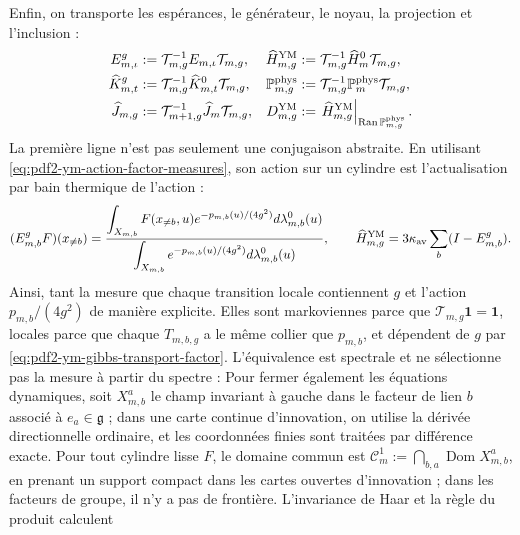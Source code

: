 Enfin, on transporte les espérances, le générateur, le noyau, la projection et l’inclusion :
\begin{equation}\label{eq:pdf2-ym-g-dynamics}
 \begin{aligned}
 E_{m,\iota}^{g}&:=\mathcal T_{m,g}^{-1}E_{m,\iota}\mathcal T_{m,g},&
 \widehat H_{m,g}^{\rm YM}&:=\mathcal T_{m,g}^{-1}\widehat H_m^0\mathcal T_{m,g},\\
 \widehat K_{m,t}^{g}&:=\mathcal T_{m,g}^{-1}\widehat K_{m,t}^{0}\mathcal T_{m,g},&
 \mathbb P_{m,g}^{\rm phys}&:=\mathcal T_{m,g}^{-1}
     \mathbb P_m^{\rm phys}\mathcal T_{m,g},\\
 \widehat J_{m,g}&:=\mathcal T_{m+1,g}^{-1}
     \widehat J_m\mathcal T_{m,g},&
 D_{m,g}^{\rm YM}&:=\left.\widehat H_{m,g}^{\rm YM}
     \right|_{\operatorname{Ran}\mathbb P_{m,g}^{\rm phys}}.
 \end{aligned}
\end{equation}
La première ligne n’est pas seulement une conjugaison abstraite. En utilisant
\eqref{eq:pdf2-ym-action-factor-measures}, son action sur un cylindre est
l’actualisation par bain thermique de l’action :
\begin{equation}\label{eq:pdf2-ym-gibbs-conditional-expectation}
 (E_{m,b}^{g}F)(x_{\ne b})
 =\frac{\displaystyle
   \int_{X_{m,b}}F(x_{\ne b},u)e^{-p_{m,b}(u)/(4g^2)}
       d\lambda_{m,b}^0(u)}{\displaystyle
   \int_{X_{m,b}}e^{-p_{m,b}(u)/(4g^2)}d\lambda_{m,b}^0(u)},
 \qquad
 \widehat H_{m,g}^{\rm YM}
 =3\kappa_{\rm av}\sum_b(I-E_{m,b}^{g}).
\end{equation}
Ainsi, tant la mesure que chaque transition locale contiennent $g$ et l’action
$p_{m,b}/(4g^2)$ de manière explicite.
Elles sont markoviennes parce que $\mathcal T_{m,g}\mathbf1=\mathbf1$, locales parce que chaque
$T_{m,b,g}$ a le même collier que $p_{m,b}$, et dépendent de $g$ par
\eqref{eq:pdf2-ym-gibbs-transport-factor}. L’équivalence est spectrale et ne
sélectionne pas la mesure à partir du spectre :
Pour fermer également les équations dynamiques, soit $X_{m,b}^a$ le champ
invariant à gauche dans le facteur de lien $b$ associé à
$e_a\in\mathfrak g$ ; dans une carte continue d’innovation, on utilise la dérivée
directionnelle ordinaire, et les coordonnées finies sont traitées par différence exacte.
Pour tout cylindre lisse $F$, le domaine commun est
$\mathscr C_m^1:=\bigcap_{b,a}\operatorname{Dom}X_{m,b}^a$, en prenant un support
compact dans les cartes ouvertes d’innovation ; dans les facteurs de groupe, il n’y a pas de
frontière. L’invariance de Haar et la règle du produit calculent
